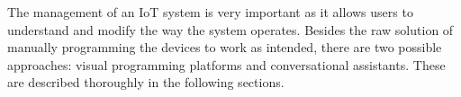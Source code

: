 \documentclass[runningheads]{llncs}
\begin{document}
The management of an IoT system is very important as it allows users to understand and modify the way the system operates. Besides the raw solution of manually programming the devices to work as intended, there are two possible approaches: visual programming platforms and conversational assistants. These are described thoroughly in the following sections.




\end{document}
